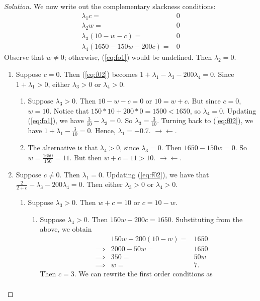 \documentclass[12pt]{article}
\theoremstyle{definition}
\theoremstyle{remark}
\def\la{\lambda}
\begin{document}
\begin{proof}[Solution]
We now write out the complementary slackness conditions:
\begin{align*}
  \lambda_1c =& 0 \\
  \lambda_2w =& 0 \\
  \lambda_3(10-w-c) =& 0 \\
  \lambda_4(1650 - 150w - 200c) =& 0
\end{align*}
Observe that $w \neq 0$; otherwise, (\ref{eq:fo1}) would be undefined. Then $\lambda_2 = 0$.
\begin{enumerate}
  \item Suppose $c = 0$. Then (\ref{eq:f02}) becomes $1 + \lambda_1 - \lambda_3 - 200\lambda_4 = 0$. Since $1 + \lambda_1 > 0$, either $\lambda_3 > 0$ or $\lambda_4 > 0$.
  \begin{enumerate}
    \item Suppose $\lambda_3 > 0$. Then $10 - w - c = 0$ or $10 = w + c$. But since $c = 0$, $w = 10$. Notice that $150*10 +200*0 = 1500 < 1650$, so $\lambda_4 = 0$. Updating (\ref{eq:fo1}), we have $\frac{3}{10} - \lambda_3  = 0$. So $\lambda_3 = \frac{3}{10}$.
    Turning back to (\ref{eq:f02}), we have $1 + \lambda_1 - \frac{3}{10} = 0$. Hence, $\lambda_1 = -0.7$. $\rightarrow \leftarrow$.
    \item The alternative is that $\la_4 > 0$, since $\la_3 = 0$. Then $1650 - 150w = 0$. So $w = \frac{1650}{150} = 11$. But then $w + c = 11 > 10$. $\rightarrow \leftarrow$.
  \end{enumerate}
  \item Suppose $c \neq 0$. Then $\la_1 = 0$. Updating (\ref{eq:f02}), we have that $\frac{2}{2+c} - \lambda_3 - 200\lambda_4 =0$. Then either $\la_3 >0$ or $\la_4 > 0$.
  \begin{enumerate}
    \item Suppose $\la_3 > 0$. Then $w+c = 10$ or $c = 10 - w$.
    \begin{enumerate}
      \item Suppose $\la_4 > 0$. Then $150w + 200c = 1650$. Substituting from the above, we obtain
      \begin{align*}
        &&           150w + 200(10-w) =& 1650 \\
        & \implies & 2000 - 50w =& 1650 \\
        & \implies & 350 =& 50w \\
        & \implies & w =& 7.
      \end{align*}
      Then $c = 3$. We can rewrite the first order conditions as
      \begin{align*}

\end{align*}
\end{enumerate}
\end{enumerate}
\end{enumerate}
\end{proof}
\end{document}
